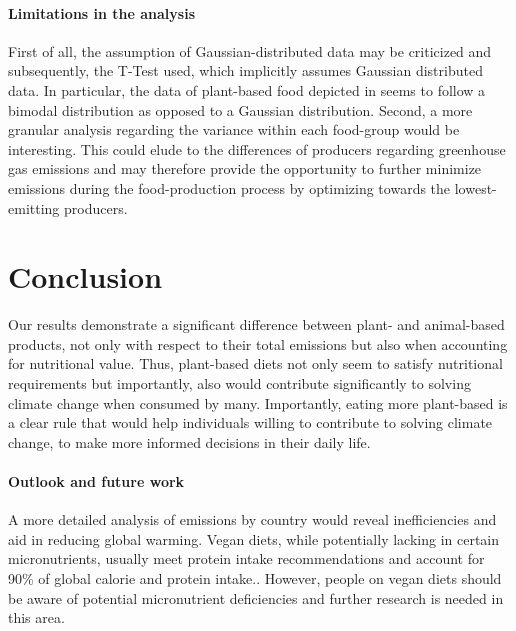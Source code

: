 \documentclass{article}
\begin{document}
\paragraph*{Limitations in the analysis}
First of all, the assumption of Gaussian-distributed data may be criticized and subsequently, the T-Test used, which implicitly assumes Gaussian distributed data.
In particular, the data of plant-based food depicted in  seems to follow a bimodal distribution as opposed to a Gaussian distribution.
Second, a more granular analysis regarding the variance within each food-group would be interesting. This could elude to the differences of producers regarding greenhouse gas emissions and may therefore provide the opportunity to further minimize emissions during the food-production process by optimizing towards the lowest-emitting producers. 


\section{Conclusion}
\label{sec:conclusion}
Our results demonstrate a significant difference between plant- and animal-based products, not only with respect to their total emissions but also when accounting for nutritional value. Thus, plant-based diets not only seem to satisfy nutritional requirements \cite{WHO2021} but importantly, also would contribute significantly to solving climate change when consumed by many. Importantly, eating more plant-based is a clear rule that would help individuals willing to contribute to solving climate change, to make more informed decisions in their daily life. 

\paragraph*{Outlook and future work}
A more detailed analysis of emissions by country would reveal inefficiencies and aid in reducing global warming. Vegan diets, while potentially lacking in certain micronutrients, usually meet protein intake recommendations and account for 90\% of global calorie and protein intake.\cite{WHO2021}. However, people on vegan diets should be aware of potential micronutrient deficiencies and further research is needed in this area.

  
{\small


}
\end{document}
